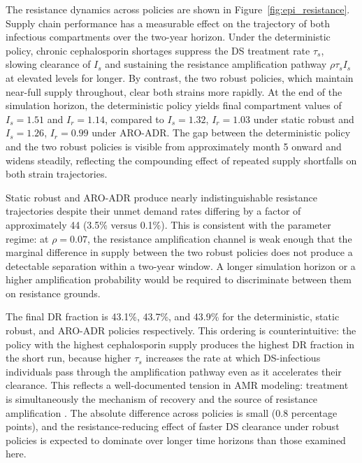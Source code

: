 \documentclass{article}
\begin{document}
The resistance dynamics across policies are shown in Figure~\ref{fig:epi_resistance}. Supply chain performance has a measurable effect on the trajectory of both infectious compartments over the two-year horizon. Under the deterministic policy, chronic cephalosporin shortages suppress the DS treatment rate $\tau_s$, slowing clearance of $I_s$ and sustaining the resistance amplification pathway $\rho \tau_s I_s$ at elevated levels for longer. By contrast, the two robust policies, which maintain near-full supply throughout, clear both strains more rapidly. At the end of the simulation horizon, the deterministic policy yields final compartment values of $I_s = 1.51$ and $I_r = 1.14$, compared to $I_s = 1.32$, $I_r = 1.03$ under static robust and $I_s = 1.26$, $I_r = 0.99$ under ARO-ADR. The gap between the deterministic policy and the two robust policies is visible from approximately month 5 onward and widens steadily, reflecting the compounding effect of repeated supply shortfalls on both strain trajectories.

Static robust and ARO-ADR produce nearly indistinguishable resistance trajectories despite their unmet demand rates differing by a factor of approximately 44 (3.5\% versus 0.1\%). This is consistent with the parameter regime: at $\rho = 0.07$, the resistance amplification channel is weak enough that the marginal difference in supply between the two robust policies does not produce a detectable separation within a two-year window. A longer simulation horizon or a higher amplification probability would be required to discriminate between them on resistance grounds.

The final DR fraction is 43.1\%, 43.7\%, and 43.9\% for the deterministic, static robust, and ARO-ADR policies respectively. This ordering is counterintuitive: the policy with the highest cephalosporin supply produces the highest DR fraction in the short run, because higher $\tau_s$ increases the rate at which DS-infectious individuals pass through the amplification pathway even as it accelerates their clearance. This reflects a well-documented tension in AMR modeling: treatment is simultaneously the mechanism of recovery and the source of resistance amplification \cite{kd20}. The absolute difference across policies is small (0.8 percentage points), and the resistance-reducing effect of faster DS clearance under robust policies is expected to dominate over longer time horizons than those examined here.
\end{document}
